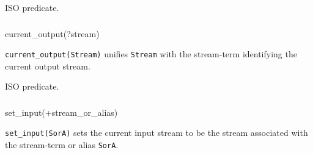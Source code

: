 \Portability

ISO predicate.

\subsubsection{}

\begin{TemplatesOneCol}
current\_output(?stream)

\end{TemplatesOneCol}

\Description

\texttt{current\_output(Stream)} unifies \texttt{Stream} with the
stream-term identifying the current output stream.

\begin{PlErrors}


\end{PlErrors}

\Portability

ISO predicate.

\subsubsection{\label{set-input/1}}

\begin{TemplatesOneCol}
set\_input(+stream\_or\_alias)

\end{TemplatesOneCol}

\Description

\texttt{set\_input(SorA)} sets the current input stream to be the stream
associated with the stream-term or alias \texttt{SorA}.

\begin{PlErrors}





\end{PlErrors}

